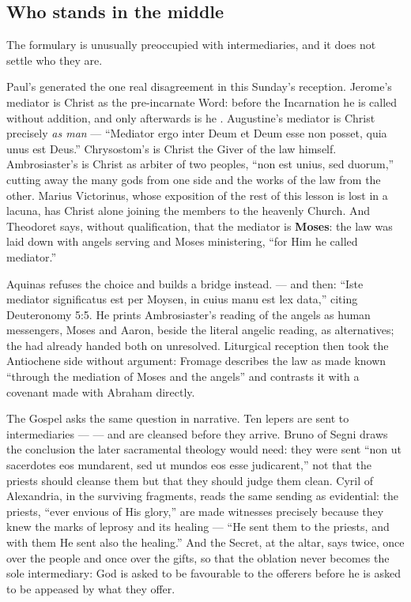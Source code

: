 \subsection*{Who stands in the middle}

The formulary is unusually preoccupied with intermediaries, and it does not
settle who they are.

Paul's  generated the one real
disagreement in this Sunday's reception. Jerome's mediator is Christ as the
pre-incarnate Word: before the Incarnation he is called 
without addition, and only afterwards is he . Augustine's mediator is Christ precisely \textit{as man}
--- ``Mediator ergo inter Deum et Deum esse non posset, quia unus est Deus.''
Chrysostom's is Christ the Giver of the law himself. Ambrosiaster's is Christ
as arbiter of two peoples, ``non est unius, sed duorum,'' cutting away the many
gods from one side and the works of the law from the other. Marius Victorinus,
whose exposition of the rest of this lesson is lost in a lacuna, has Christ
alone joining the members to the heavenly Church. And Theodoret says, without
qualification, that the mediator is \textbf{Moses}: the law was laid down with
angels serving and Moses ministering, ``for Him he called mediator.''

Aquinas refuses the choice and builds a bridge instead.  --- and then: ``Iste mediator
significatus est per Moysen, in cuius manu est lex data,'' citing Deuteronomy
5:5. He prints Ambrosiaster's reading of the angels as human messengers,
Moses and Aaron, beside the literal angelic reading, as alternatives; the
 had already handed both on unresolved. Liturgical
reception then took the Antiochene side without argument: Fromage describes
the law as made known ``through the mediation of Moses and the angels'' and
contrasts it with a covenant made with Abraham directly.

The Gospel asks the same question in narrative. Ten lepers are sent to
intermediaries ---  --- and are cleansed
before they arrive. Bruno of Segni draws the conclusion the later sacramental
theology would need: they were sent ``non ut sacerdotes eos mundarent, sed ut
mundos eos esse judicarent,'' not that the priests should cleanse them but that
they should judge them clean. Cyril of Alexandria, in the surviving fragments,
reads the same sending as evidential: the priests, ``ever envious of His
glory,'' are made witnesses precisely because they knew the marks of leprosy
and its healing --- ``He sent them to the priests, and with them He sent also
the healing.'' And the Secret, at the altar, says  twice, once
over the people and once over the gifts, so that the oblation never becomes the
sole intermediary: God is asked to be favourable to the offerers before he is
asked to be appeased by what they offer.

